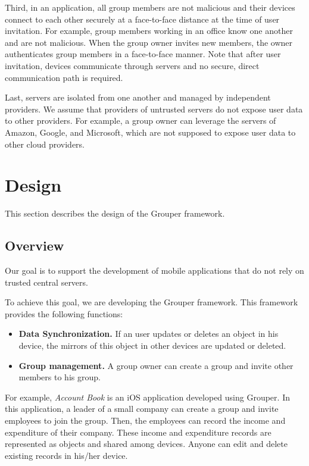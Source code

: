 \documentclass[sigconf]{acmart}
\begin{document}
Third, in an application, all group members are not malicious and their devices connect to each other securely at a face-to-face distance at the time of user invitation.
For example, group members working in an office know one another and are not malicious.
When the group owner invites new members, the owner authenticates group members in a face-to-face manner.
Note that after user invitation, devices communicate through servers and no secure, direct communication path is required.

Last, servers are isolated from one another and managed by independent providers.
We assume that providers of untrusted servers do not expose user data to other providers.
For example, a group owner can leverage the servers of Amazon, Google, and Microsoft, which are not supposed to expose user data to other cloud providers.

\section{Design}

This section describes the design of the Grouper framework.

\subsection{Overview}

Our goal is to support the development of mobile applications that do not rely on trusted central servers.

To achieve this goal, we are developing the Grouper framework.
This framework provides the following functions:

\begin{itemize}
	\setlength{\itemsep}{1pt}
	\setlength{\parskip}{0pt}
	\setlength{\parsep}{0pt}
	\item \textbf{Data Synchronization.} 
	If an user updates or deletes an object in his device, the mirrors of this object in other devices are updated or deleted.
	\item \textbf{Group management.} 
	A group owner can create a group and invite other members to his group.
\end{itemize}

For example, \emph{Account Book} is an iOS application developed using Grouper. 
In this application, a leader of a small company can create a group and invite employees to join the group. 
Then, the employees can record the income and expenditure of their company.
These income and expenditure records are represented as objects and shared among devices.
Anyone can edit and delete existing records in his/her device.
\end{document}
